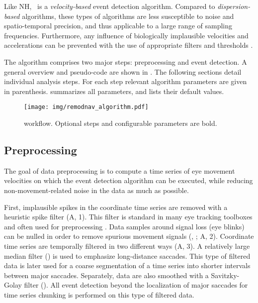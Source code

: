 Like NH, \remodnav\ is a \textit{velocity-based} event detection algorithm.
Compared to \textit{dispersion-based} algorithms, these types of algorithms are
less susceptible to noise and spatio-temporal precision, and thus applicable to
a large range of sampling frequencies. Furthermore, any influence of
biologically implausible velocities and accelerations can be prevented with the
use of appropriate filters and thresholds \citep{holmqvist2011eye}.

The algorithm comprises two major steps: preprocessing and event detection.  A
general overview and pseudo-code are shown in .  The following
sections detail individual analysis steps. For each step relevant algorithm
parameters are given in parenthesis.  summarizes all
parameters, and lists their default values.

\begin{figure*}
  \texttt{[image: img/remodnav\_algorithm.pdf]}
  \caption{\remodnav workflow. Optional steps and configurable parameters are bold.}
  \label{fig:alg}
\end{figure*}


\subsection*{Preprocessing}

The goal of data preprocessing is to compute a time series of eye movement
velocities on which the event detection algorithm can be executed, while
reducing non-movement-related noise in the data as much as possible. 

First, implausible spikes in the coordinate time series are removed with a
heuristic spike filter \citep{stampe1993} (A, 1). This filter is
standard in many eye tracking toolboxes and often used for preprocessing
\citep[\eg][]{Nystrom2010AnData}.
%
Data samples around signal loss (\eg eye blinks) can be nulled in order to
remove spurious movement signals (, ; A, 2).
%
Coordinate time series are temporally filtered in two different ways
(A, 3). A relatively large median filter
() is used to emphasize long-distance saccades.
This type of filtered data is later used for a coarse segmentation of a time
series into shorter intervals between major saccades.
%
Separately, data are also smoothed with a Savitzky-Golay filter
(). All event detection beyond the
localization of major saccades for time series chunking is performed on this
type of filtered data.

